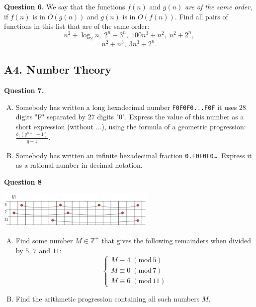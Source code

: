 \documentclass[jou]{apa6}
\begin{document}
\vspace{6pt}
{\bf Question 6.} We say that the functions $f(n)$ and $g(n)$
{\em are of the same order}, if $f(n)$ is in $O(g(n))$ and
$g(n)$ is in $O(f(n))$. Find all pairs of functions in this 
list that are of the same order:
$$n^2 + \log_2 n,\; 2^n + 3^n,\; 100n^3 + n^2,\; n^2 + 2^n,$$
$$n^2 + n^3,\;3n^3 + 2^n.$$






\subsection{A4. Number Theory}


{\bf Question 7.}
\begin{enumerate}[(A)]
\item
Somebody has written a long hexadecimal number
{\tt F0F0F0...F0F} \textendash{} it uses $28$ digits "F"
separated by $27$ digits "0". 
Express the value of this number as a short expression
(without $\ldots$), using
the formula of a geometric progression: $\frac{b_1(q^{n+1}-1)}{q - 1}$. 
\item 
Somebody has written an infinite hexadecimal fraction 
{\tt 0.F0F0F0\ldots}. Express it as a rational number in 
decimal notation. 
\end{enumerate}



\vspace{6pt}
{\bf Question 8} 
\begin{center}
\includegraphics[width=3in]{midterm/sequences.png}
\end{center}

\begin{enumerate}[(A)]
\item Find some number $M \in \mathbb{Z}^{+}$ 
that gives the following remainders when divided by 
$5$, $7$ and $11$: 
$$\left\{
\begin{array}{l}
M \equiv 4\;(\text{mod}\,5)\\
M \equiv 0\;(\text{mod}\,7)\\
M \equiv 6\;(\text{mod}\,11)
\end{array} \right.$$
\item Find the arithmetic progression containing all such numbers $M$.
\end{enumerate}
\end{document}
